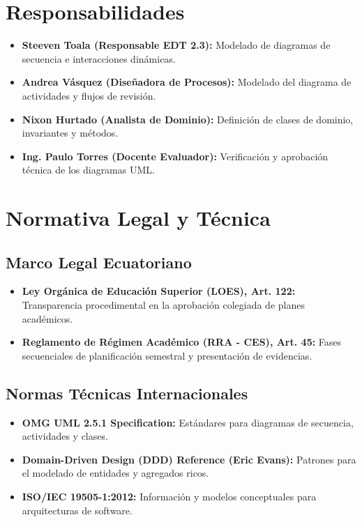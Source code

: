 \documentclass[12pt,a4paper]{article}
\begin{document}
\section{Responsabilidades}
\begin{itemize}[leftmargin=1.5em, itemsep=2pt]
    \item \textbf{Steeven Toala (Responsable EDT 2.3):} Modelado de diagramas de secuencia e interacciones dinámicas.
    \item \textbf{Andrea Vásquez (Diseñadora de Procesos):} Modelado del diagrama de actividades y flujos de revisión.
    \item \textbf{Nixon Hurtado (Analista de Dominio):} Definición de clases de dominio, invariantes y métodos.
    \item \textbf{Ing. Paulo Torres (Docente Evaluador):} Verificación y aprobación técnica de los diagramas UML.
\end{itemize}

\section{Normativa Legal y Técnica}
\subsection{Marco Legal Ecuatoriano}
\begin{itemize}[leftmargin=1.5em, itemsep=2pt]
    \item \textbf{Ley Orgánica de Educación Superior (LOES), Art. 122:} Transparencia procedimental en la aprobación colegiada de planes académicos.
    \item \textbf{Reglamento de Régimen Académico (RRA - CES), Art. 45:} Fases secuenciales de planificación semestral y presentación de evidencias.
\end{itemize}
\subsection{Normas Técnicas Internacionales}
\begin{itemize}[leftmargin=1.5em, itemsep=2pt]
    \item \textbf{OMG UML 2.5.1 Specification:} Estándares para diagramas de secuencia, actividades y clases.
    \item \textbf{Domain-Driven Design (DDD) Reference (Eric Evans):} Patrones para el modelado de entidades y agregados ricos.
    \item \textbf{ISO/IEC 19505-1:2012:} Información y modelos conceptuales para arquitecturas de software.
\end{itemize}
\end{document}
